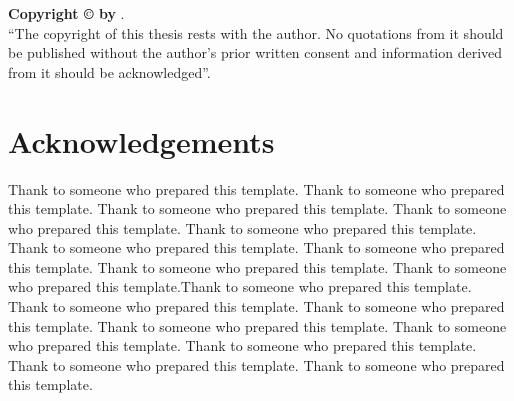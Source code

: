 \vspace{2in}
\noindent \textbf{Copyright \copyright{} by \authorLi}.\\
``The copyright of this thesis rests with the author.  No quotations
from it should be published without the author's prior written consent
and information derived from it should be acknowledged''.



\chapter*{Acknowledgements}
Thank to someone who prepared this template. Thank to someone who
prepared this template. Thank to someone who prepared this template.
Thank to someone who prepared this template. Thank to someone who
prepared this template. Thank to someone who prepared this template.
Thank to someone who prepared this template. Thank to someone who
prepared this template. Thank to someone who prepared this
template.Thank to someone who prepared this template. Thank to someone
who prepared this template. Thank to someone who prepared this
template. Thank to someone who prepared this template. Thank to
someone who prepared this template. Thank to someone who prepared this
template. Thank to someone who prepared this template. Thank to
someone who prepared this template.

\tableofcontents
\listoffigures
\listoftables
\clearpage











